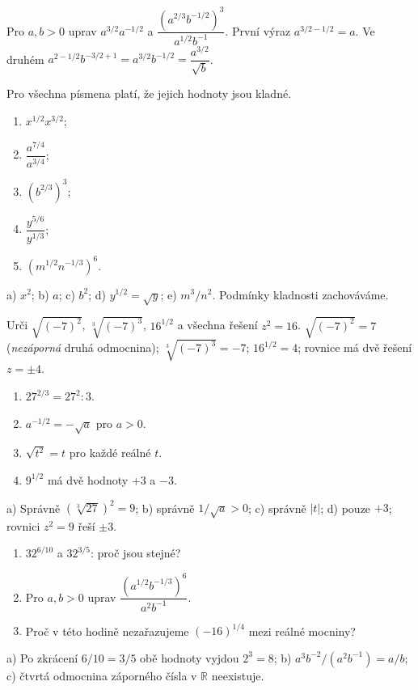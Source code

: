 \documentclass[11pt,a4paper]{article}
\begin{document}
\begin{prikladReseniBox}[title={Příklad 2: stejná pravidla, nové exponenty}]
Pro $a,b>0$ uprav $a^{3/2}a^{-1/2}$ a
$\dfrac{(a^{2/3}b^{-1/2})^3}{a^{1/2}b^{-1}}$.
\tcblower
První výraz $a^{3/2-1/2}=a$.
Ve druhém $a^{2-1/2}b^{-3/2+1}=a^{3/2}b^{-1/2}
=\dfrac{a^{3/2}}{\sqrt b}$.
\end{prikladReseniBox}
\begin{zadaniReseniBox}[title={Samostatná práce 2: mocniny se zlomkovým exponentem}]
Pro všechna písmena platí, že jejich hodnoty jsou kladné.
\begin{enumerate}[label=\alph*)]
\item $x^{1/2}x^{3/2}$; \item $\dfrac{a^{7/4}}{a^{3/4}}$;
\item $(b^{2/3})^3$;
\item $\dfrac{y^{5/6}}{y^{1/3}}$;
\item $(m^{1/2}n^{-1/3})^6$.
\end{enumerate}
\tcblower
 a) $x^2$; b) $a$; c) $b^2$; d) $y^{1/2}=\sqrt y$;
 e) $m^3/n^2$. Podmínky kladnosti zachováváme.
\end{zadaniReseniBox}

\begin{prikladReseniBox}[title={Příklad 3: poznáš rozdíl mezi odmocninou a rovnicí?}]
Urči $\sqrt{(-7)^2}$, $\sqrt[3]{(-7)^3}$, $16^{1/2}$
a všechna řešení $z^2=16$.
\tcblower
$\sqrt{(-7)^2}=7$ (\emph{nezáporná} druhá odmocnina);
$\sqrt[3]{(-7)^3}=-7$; $16^{1/2}=4$;
rovnice má dvě řešení $z=\pm4$.
\end{prikladReseniBox}
\begin{zadaniReseniBox}[title={Samostatná práce 3: oprav chybná tvrzení}]
\begin{enumerate}[label=\alph*)]
\item $27^{2/3}=27^2:3$.
\item $a^{-1/2}=-\sqrt a$ pro $a>0$.
\item $\sqrt{t^2}=t$ pro každé reálné $t$.
\item $9^{1/2}$ má dvě hodnoty $+3$ a $-3$.
\end{enumerate}
\tcblower
 a) Správně $(\sqrt[3]{27})^2=9$;
 b) správně $1/\sqrt a>0$;
 c) správně $|t|$;
 d) pouze $+3$; rovnici $z^2=9$ řeší $\pm3$.
\end{zadaniReseniBox}

\begin{zadaniReseniBox}[title={Rozšiřující příklad 1: zlomky v exponentu}]
\begin{enumerate}[label=\alph*)]
\item $32^{6/10}$ a $32^{3/5}$: proč jsou stejné?
\item Pro $a,b>0$ uprav $\dfrac{(a^{1/2}b^{-1/3})^6}{a^2b^{-1}}$.
\item Proč v této hodině nezařazujeme $(-16)^{1/4}$ mezi reálné mocniny?
\end{enumerate}
\tcblower
 a) Po zkrácení $6/10=3/5$ obě hodnoty vyjdou $2^3=8$;
 b) $a^3b^{-2}/(a^2b^{-1})=a/b$;
 c) čtvrtá odmocnina záporného čísla v $\mathbb R$ neexistuje.
\end{zadaniReseniBox}
\end{document}

